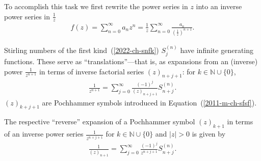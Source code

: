 To accomplish this task we first rewrite the power series in $z$ into an inverse power series in $\frac{1}{z}$
\begin{equation}
\begin{split}
f(z)
= \sum_{n=0}^\infty a_n z^n
= \frac{1}{z}  \sum_{n=0}^\infty \frac{a_n}{\left(\frac{1}{z}\right)^{n+1}}
.
\end{split}
\label{2022-m-ch-dsinv}
\end{equation}

Stirling numbers of the first kind~(\ref{2022-ch-snfk})
${S}_j^{(n)}$
have infinite generating functions.
These serve as ``translations''---that is, as expansions from
an (inverse) power $\frac{1}{z^{n+1}}$ in terms of  inverse  factorial series $(z)_{n+j+1}$:
for $k  \in \mathbb{N} \cup \{0\}$,
\begin{equation}
\begin{split}
\frac{1}{z^{n+1}}  = \sum_{j=0}^\infty \frac{(-1)^j}{(z)_{n+j+1}} {S}_{n+j}^{(n)}
.
\end{split}
\label{2022-m-ch-dsngf}
\end{equation}
$(z)_{k+j+1}$ are Pochhammer symbols
introduced in Equation~(\ref{2011-m-ch-sfsf}).

The respective ``reverse'' expansion of a Pochhammer symbol $(z)_{k+1}$ in terms of  an inverse power series
$\frac{1}{z^{n+j+1}}$
for $k  \in \mathbb{N} \cup \{0\}$ and $\vert z \vert >0$
is given by
\begin{equation}
\begin{split}
\frac{1}{(z)_{n+1}}  = \sum_{j=0}^\infty \frac{(-1)^j}{z^{n+j+1}} {S}_{n+j}^{(n)}
.
\end{split}
\label{2022-m-ch-dsngfinverse}
\end{equation}



